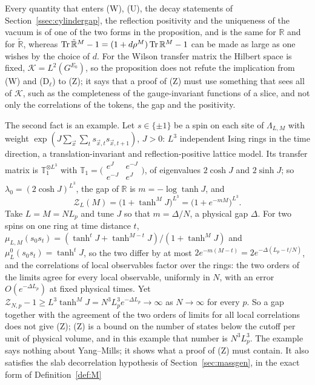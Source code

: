 Every quantity that enters (W), (U), the decay statements of
Section~\ref{ssec:cylindergap}, the reflection positivity and the uniqueness
of the vacuum is of one of the two forms in the proposition, and is the same
for $\mathbb R$ and for $\tilde{\mathbb R}$, whereas $\operatorname{Tr}\tilde{\mathbb
R}^M-1=(1+d\rho^M)\operatorname{Tr}\mathbb R^M-1$ can be made as large as one wishes by
the choice of $d$. For the Wilson transfer matrix the Hilbert space is fixed,
$\mathcal K=L^2(G^{E_0})$, so the proposition does not refute the
implication from (W) and (D$_\ell$) to (Z); it says that a proof of (Z) must use
something that sees all of $\mathcal K$, such as the completeness of the
gauge-invariant functions of a slice, and not only the correlations of the
tokens, the gap and the positivity.

The second fact is an example. Let $s\in\{\pm1\}$ be a spin on each site of
$\Lambda_{L,M}$ with weight $\exp(J\sum_{\vec x}\sum_ts_{\vec x,t}
s_{\vec x,t+1})$, $J>0$: $L^3$ independent Ising rings in the time
direction, a translation-invariant and reflection-positive lattice model.
Its transfer matrix is $\mathbb T_1^{\otimes L^3}$ with $\mathbb T_1=
\bigl(\begin{smallmatrix}e^J&e^{-J}\\e^{-J}&e^J\end{smallmatrix}\bigr)$, of
eigenvalues $2\cosh J$ and $2\sinh J$; so $\lambda_0=(2\cosh J)^{L^3}$, the
gap of $\mathbb R$ is $m=-\log\tanh J$, and
\[
\mathcal Z_L(M)=\bigl(1+\tanh^MJ\bigr)^{L^3}=\bigl(1+e^{-mM}\bigr)^{L^3}.
\]
Take $L=M=NL_p$ and tune $J$ so that $m=\Delta/N$, a physical gap $\Delta$.
For two spins on one ring at time distance $t$, $\mu_{L,M}(s_0s_t)=
(\tanh^tJ+\tanh^{M-t}J)/(1+\tanh^MJ)$ and $\mu^0_L(s_0s_t)=\tanh^tJ$, so
the two differ by at most $2e^{-m(M-t)}=2e^{-\Delta(L_p-t/N)}$, and the
correlations of local observables factor over the rings: the two orders of
the limits agree for every local observable, uniformly in $N$, with an error
$O(e^{-\Delta L_p})$ at fixed physical times. Yet $\mathcal Z_{N,p}-1\ge
L^3\tanh^MJ=N^3L_p^3e^{-\Delta L_p}\to\infty$ as $N\to\infty$ for every $p$.
So a gap together with the agreement of the two orders of limits for all
local correlations does not give (Z); (Z) is a bound on the number of
states below the cutoff per unit of physical volume, and in this example
that number is $N^3L_p^3$. The example says nothing about Yang--Mills; it shows what a proof of
(Z) must contain. It also satisfies the slab decorrelation hypothesis of
Section~\ref{sec:massgen}, in the exact form of Definition~\ref{def:M}
